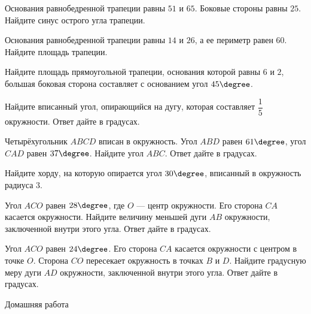 \begin{class}[number=2]
\begin{listofex}
		\item Основания равнобедренной трапеции равны \( 51 \) и \( 65 \). Боковые стороны равны \( 25 \). Найдите синус острого угла трапеции.
		\item Основания равнобедренной трапеции равны \( 14 \) и \( 26 \), а ее периметр равен \( 60 \). Найдите площадь трапеции.
		\item Найдите площадь прямоугольной трапеции, основания которой равны \( 6 \) и \( 2 \), большая боковая сторона составляет с основанием угол \( 45\degree \).
		\item Найдите вписанный угол, опирающийся на дугу, которая составляет \( \dfrac{1}{5} \) окружности. Ответ дайте в градусах.
		\item Четырёхугольник \( ABCD \) вписан в окружность. Угол \( ABD \) равен \( 61\degree \), угол \( CAD \) равен \( 37\degree \). Найдите угол \( ABC \). Ответ дайте в градусах.
		\item Найдите хорду, на которую опирается угол \( 30\degree \), вписанный в окружность радиуса \( 3 \).
		\item Угол \( ACO \) равен \( 28\degree \), где \( O \) --- центр окружности. Его сторона \( CA \) касается окружности. Найдите величину меньшей дуги \( AB \) окружности, заключенной внутри этого угла. Ответ дайте в градусах.
		\item Угол \( ACO \) равен \( 24\degree \). Его сторона \( CA \) касается окружности с центром в точке \( O \). Сторона \( CO \) пересекает окружность в точках \( B \) и \( D \). Найдите градусную меру дуги \( AD \) окружности, заключенной внутри этого угла. Ответ дайте в градусах.
	\end{listofex}
\end{class}

\begin{homework}[number=2]
	\begin{listofex}
		\item Домашняя работа
	\end{listofex}
\end{homework}

